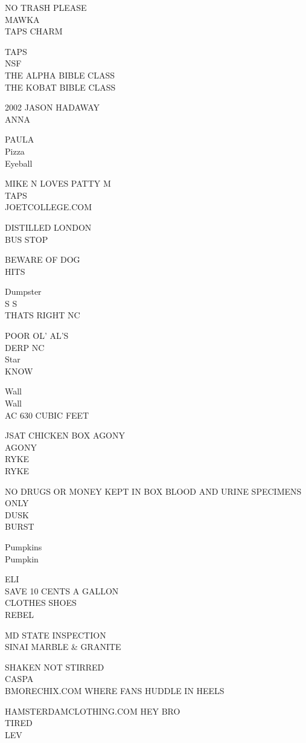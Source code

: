 \documentclass[10pt,letterpaper]{article}
\begin{document}
NO TRASH PLEASE\\
MAWKA\\
TAPS CHARM

TAPS\\
NSF\\
THE ALPHA BIBLE CLASS\\
THE KOBAT BIBLE CLASS

2002 JASON HADAWAY\\
ANNA

PAULA\\
Pizza\\
Eyeball

MIKE N LOVES PATTY M\\
TAPS\\
JOETCOLLEGE.COM

DISTILLED LONDON\\
BUS STOP

BEWARE OF DOG\\
HITS

Dumpster\\
S S\\
THATS RIGHT NC

POOR OL' AL'S\\
DERP NC\\
Star\\
KNOW

Wall\\
Wall\\
AC 630 CUBIC FEET

JSAT CHICKEN BOX AGONY\\
AGONY\\
RYKE\\
RYKE

NO DRUGS OR MONEY KEPT IN BOX BLOOD AND URINE SPECIMENS ONLY\\
DUSK\\
BURST

Pumpkins\\
Pumpkin

ELI\\
SAVE 10 CENTS A GALLON\\
CLOTHES SHOES\\
REBEL

MD STATE INSPECTION\\
SINAI MARBLE \& GRANITE

SHAKEN NOT STIRRED\\
CASPA\\
BMORECHIX.COM WHERE FANS HUDDLE IN HEELS

HAMSTERDAMCLOTHING.COM HEY BRO\\
TIRED\\
LEV
\end{document}
